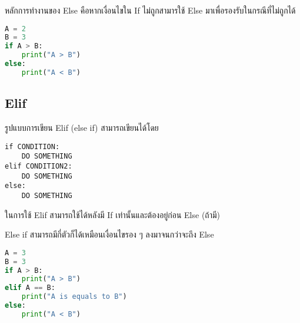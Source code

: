 หลักการทำงานของ Else คือหากเงื่อนไขใน If ไม่ถูกสามารใช้ Else มาเพื่อรองรับในกรณีที่ไม่ถูกได้

\begin{lstlisting}[language=Python]
A = 2
B = 3
if A > B:
    print("A > B")
else:
    print("A < B")
\end{lstlisting}

\subsection{Elif}

รูปแบบการเขียน Elif (else if) สามารถเขียนได้โดย 

\begin{verbatim}
if CONDITION:
    DO SOMETHING
elif CONDITION2:
    DO SOMETHING
else:
    DO SOMETHING
\end{verbatim}

ในการใช้ Elif สามารถใช้ได้หลังมี If เท่านั้นและต้องอยู่ก่อน Else (ถ้ามี)

Else if สามารถมีกี่ตัวก็ได้เหมือนเงื่อนไขรอง ๆ ลงมาจนกว่าจะถึง Else

\begin{lstlisting}[language=Python]
A = 3
B = 3
if A > B:
    print("A > B")
elif A == B:
    print("A is equals to B")
else:
    print("A < B")
\end{lstlisting}
